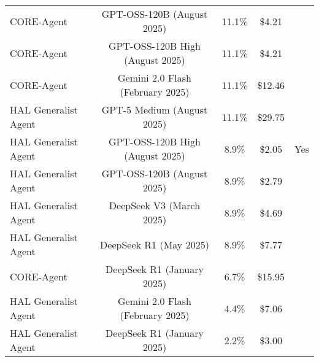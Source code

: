 \begin{tabular}{lcccc}
CORE-Agent & GPT-OSS-120B (August 2025) & 11.1\% & \$4.21 &  \\
CORE-Agent & GPT-OSS-120B High (August 2025) & 11.1\% & \$4.21 &  \\
CORE-Agent & Gemini 2.0 Flash (February 2025) & 11.1\% & \$12.46 &  \\
HAL Generalist Agent & GPT-5 Medium (August 2025) & 11.1\% & \$29.75 &  \\
HAL Generalist Agent & GPT-OSS-120B High (August 2025) & 8.9\% & \$2.05 & Yes \\
HAL Generalist Agent & GPT-OSS-120B (August 2025) & 8.9\% & \$2.79 &  \\
HAL Generalist Agent & DeepSeek V3 (March 2025) & 8.9\% & \$4.69 &  \\
HAL Generalist Agent & DeepSeek R1 (May 2025) & 8.9\% & \$7.77 &  \\
CORE-Agent & DeepSeek R1 (January 2025) & 6.7\% & \$15.95 &  \\
HAL Generalist Agent & Gemini 2.0 Flash (February 2025) & 4.4\% & \$7.06 &  \\
HAL Generalist Agent & DeepSeek R1 (January 2025) & 2.2\% & \$3.00 &  \\
\bottomrule
\end{tabular}